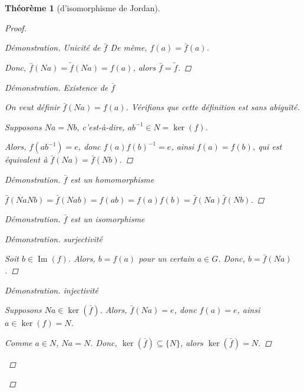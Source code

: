 \documentclass{report}
\newcommand*{\image}{\operatorname{Im}}
\newtheorem*{thm}{Th\'eor\`eme}
\theoremstyle{definition}
\theoremstyle{remark}
\newenvironment*{subproof}[1][D\'emonstration]
{
\begin{proof}[#1]

}
{
	\renewcommand{\qedsymbol}{$\blacksquare$}
\end{proof}
\renewcommand{\qedsymbol}{$\square$}
}
\newenvironment*{subsubproof}[1][D\'emonstration]
{
\begin{proof}[#1]
}
{
	\renewcommand{\qedsymbol}{$\#$}
\end{proof}
\renewcommand{\qedsymbol}{$\blacksquare$}
}
\begin{document}
\begin{thm}[d'isomorphisme de Jordan]
\begin{proof}
\begin{subproof}{Unicit\'e de $\bar{f}$}
				De m\^eme, $f(a)=\bar{f}(a)$.

				Donc, $\bar{f}(Na) = \tilde{f}(Na) = f(a)$, alors $\bar{f} = \tilde{f}$.
			\end{subproof}

			\begin{subproof}{Existence de $\bar{f}$}~

				On veut d\'efinir $\bar{f}(Na)=f(a)$. V\'erifions que cette d\'efinition est sans abigu\"it\'e.

				Supposons $Na=Nb$, c'est-\`a-dire, $ab^{-1} \in N = \ker(f)$.

				Alors, $f(ab^{-1})=e$, donc $f(a)f(b)^{-1}=e$, ainsi $f(a)=f(b)$, qui est \'equivalent \`a $\bar{f}(Na) = \bar{f}(Nb)$.
			\end{subproof}

			\begin{subproof}{$\bar{f}$ est un homomorphisme}~

				$\bar{f}(NaNb) = \bar{f}(Nab) = f(ab) = f(a)f(b) = \bar{f}(Na)\bar{f}(Nb)$.
			\end{subproof}

			\begin{subproof}{$\bar{f}$ est un isomorphisme}~

				\begin{subsubproof}{surjectivit\'e}~

					Soit $b \in \image(f)$. Alors, $b=f(a)$ pour un certain $a \in G$. Donc, $b=\bar{f}(Na)$.
				\end{subsubproof}

				\begin{subsubproof}{injectivit\'e}~

					Supposons $Na \in \ker(\bar{f})$. Alors, $\bar{f}(Na)=e$, donc $f(a)=e$, ainsi $a \in \ker(f) = N$.

					Comme $a \in N$, $Na=N$. Donc, $\ker(\bar{f}) \subseteq \{N\}$, alors $\ker(\bar{f})=N$.
				\end{subsubproof}
			\end{subproof}
		\end{proof}
	\end{thm}
\end{document}
